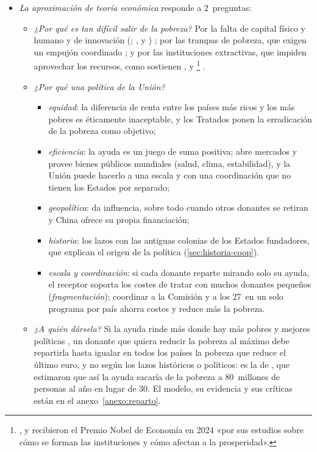 \documentclass[11pt]{article}
\begin{document}
\begin{itemize}
\item \emph{La aproximación de teoría económica} responde a 2~preguntas:
  \begin{itemize}
  \item \emph{¿Por qué es tan difícil salir de la pobreza?} Por la falta de capital físico y humano y de innovación (; ,  y )  ; por las trampas de pobreza, que exigen un empujón coordinado ; y por las instituciones extractivas, que impiden aprovechar los recursos, como sostienen ,  y \footnote{,  y  recibieron el Premio Nobel de Economía en 2024 «por sus estudios sobre cómo se forman las instituciones y cómo afectan a la prosperidad»\nocite{NobelPrize2024}.} .
  \item \emph{¿Por qué una política de la Unión?}
    \begin{itemize}
  \item \emph{equidad}: la diferencia de renta entre los países más ricos y los más pobres es éticamente inaceptable, y los Tratados ponen la erradicación de la pobreza como objetivo;
  \item \emph{eficiencia}: la ayuda es un juego de suma positiva; abre mercados y provee bienes públicos mundiales (salud, clima, estabilidad), y la Unión puede hacerlo a una escala y con una coordinación que no tienen los Estados por separado;
  \item \emph{geopolítica}: da influencia, sobre todo cuando otros donantes se retiran y China ofrece su propia financiación;
  \item \emph{historia}: los lazos con las antiguas colonias de los Estados fundadores, que explican el origen de la política (\ref{sec:historia-coop}).
    \item \emph{escala y coordinación}: si cada donante reparte mirando solo su ayuda, el receptor soporta los costes de tratar con muchos donantes pequeños (\emph{fragmentación}); coordinar a la Comisión y a los 27~en un solo programa por país ahorra costes y reduce más la pobreza\nocite{KnackRahman2007,BigstenTengstam2015}.
    \end{itemize}
  \item \emph{¿A quién dársela?} Si la ayuda rinde más donde hay más pobres y mejores políticas \parencite{BurnsideDollar2000}, un donante que quiera reducir la pobreza al máximo debe repartirla hasta igualar en todos los países la pobreza que reduce el último euro, y no según los lazos históricos o políticos: es la  de \textcite{CollierDollar2002}, que estimaron que así la ayuda sacaría de la pobreza a 80~millones de personas al año en lugar de 30. El modelo, su evidencia y sus críticas están en el anexo~\ref{anexo:reparto}.

\end{itemize}
\end{itemize}
\end{document}
